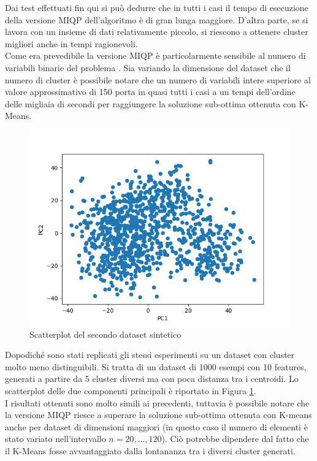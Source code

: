 \documentclass{article}
\begin{document}
    Dai test effettuati fin qui si può dedurre che in tutti i casi il tempo di esecuzione della versione MIQP dell'algoritmo è di gran lunga maggiore. D'altra parte, se si lavora con un insieme di dati relativamente piccolo, si riescono a ottenere cluster migliori anche in tempi ragionevoli.\\
    Come era prevedibile la versione MIQP è particolarmente sensibile al numero di variabili binarie del problema \cite{lapucci}. Sia variando la dimensione del dataset che il numero di cluster è possibile notare che un numero di variabili intere superiore al valore approssimativo di 150 porta in quasi tutti i casi a un tempi dell'ordine delle migliaia di secondi per raggiungere la soluzione sub-ottima ottenuta con K-Means.\\

    \begin{figure}
    \includegraphics[width=1\linewidth]{../results/plots/dataset2}
    \caption{Scatterplot del secondo dataset sintetico}
    \label{sint_sint}
    \end{figure}
    Dopodiché sono stati replicati gli stessi esperimenti su un dataset con cluster molto meno distinguibili. Si tratta di un dataset di 1000 esempi con 10 features, generati a partire da 5 cluster diversi ma con poca distanza tra i centroidi. Lo scatterplot delle due componenti principali è riportato in Figura \ref{sint_sint}.\\
    I risultati ottenuti sono molto simili ai precedenti, tuttavia è possibile notare che la versione MIQP riesce a superare la soluzione sub-ottima ottenuta con K-means anche per dataset di dimensioni maggiori (in questo caso il numero di elementi è stato variato nell'intervallo $n=20,...,120$). Ciò potrebbe dipendere dal fatto che il K-Means fosse avvantaggiato dalla lontananza tra i diversi cluster generati.\\
\end{document}

